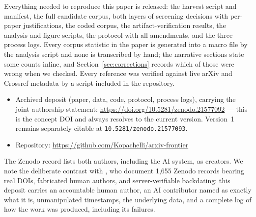 Everything needed to reproduce this paper is released: the harvest script and manifest, the
full candidate corpus, both layers of screening decisions with per-paper justifications, the
coded corpus, the artifact-verification results, the analysis and figure scripts, the protocol
with all amendments, and the three process logs. Every corpus statistic in the paper is
generated into a macro file by the analysis script and none is transcribed by hand; the
narrative sections state some counts inline, and Section~\ref{sec:corrections} records which of
those were wrong when we checked. Every reference was verified against live arXiv and Crossref
metadata by a script included in the repository.

\begin{itemize}\itemsep1pt
\item Archived deposit (paper, data, code, protocol, process logs), carrying the joint
authorship statement: \url{https://doi.org/10.5281/zenodo.21577092} --- this is the concept
DOI and always resolves to the current version. Version~1 remains separately citable at
\texttt{10.5281/zenodo.21577093}.
\item Repository: \url{https://github.com/Kopachelli/arxiv-frontier}
\end{itemize}

The Zenodo record lists both authors, including the AI system, as creators. We note the
deliberate contrast with \citet{brzozowski2026ghost}, who document 1{,}655 Zenodo records
bearing real DOIs, fabricated human authors, and server-verifiable backdating: this deposit
carries an accountable human author, an AI contributor named as exactly what it is,
unmanipulated timestamps, the underlying data, and a complete log of how the work was
produced, including its failures.
